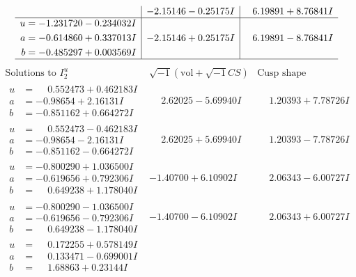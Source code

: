 \documentclass[1p]{elsarticle_modified}
\theoremstyle{definition}
\newcommand{\I}{\sqrt{-1}}
\begin{document}
$$\begin{array}{c|c|c}
 & -2.15146 - 0.25175 I & \phantom{-}6.19891 + 8.76841 I \\ \hline\begin{aligned}
u &= -1.231720 - 0.234032 I \\
a &= -0.614860 + 0.337013 I \\
b &= -0.485297 + 0.003569 I\end{aligned}
 & -2.15146 + 0.25175 I & \phantom{-}6.19891 - 8.76841 I\\
 \hline 
 \end{array}$$\newpage$$\begin{array}{c|c|c}  
\text{Solutions to }I^u_{2}& \I (\text{vol} + \sqrt{-1}CS) & \text{Cusp shape}\\
 \hline 
\begin{aligned}
u &= \phantom{-}0.552473 + 0.462183 I \\
a &= -0.98654 + 2.16131 I \\
b &= -0.851162 + 0.664272 I\end{aligned}
 & \phantom{-}2.62025 - 5.69940 I & \phantom{-}1.20393 + 7.78726 I \\ \hline\begin{aligned}
u &= \phantom{-}0.552473 - 0.462183 I \\
a &= -0.98654 - 2.16131 I \\
b &= -0.851162 - 0.664272 I\end{aligned}
 & \phantom{-}2.62025 + 5.69940 I & \phantom{-}1.20393 - 7.78726 I \\ \hline\begin{aligned}
u &= -0.800290 + 1.036500 I \\
a &= -0.619656 + 0.792306 I \\
b &= \phantom{-}0.649238 + 1.178040 I\end{aligned}
 & -1.40700 + 6.10902 I & \phantom{-}2.06343 - 6.00727 I \\ \hline\begin{aligned}
u &= -0.800290 - 1.036500 I \\
a &= -0.619656 - 0.792306 I \\
b &= \phantom{-}0.649238 - 1.178040 I\end{aligned}
 & -1.40700 - 6.10902 I & \phantom{-}2.06343 + 6.00727 I \\ \hline\begin{aligned}
u &= \phantom{-}0.172255 + 0.578149 I \\
a &= \phantom{-}0.133471 - 0.699001 I \\
b &= \phantom{-}1.68863 + 0.23144 I\end{aligned}

\end{array}$$
\end{document}
